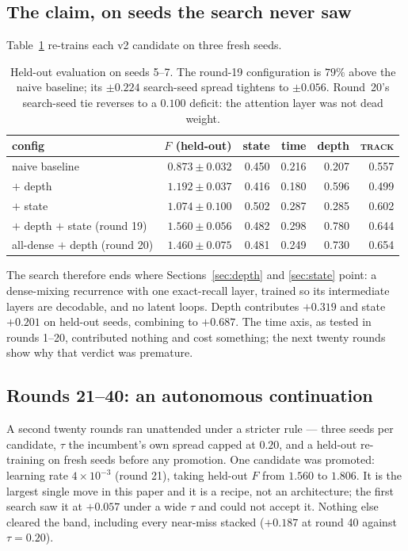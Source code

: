 \subsection{The claim, on seeds the search never saw}

Table~\ref{tab:holdout} re-trains each v2 candidate on three fresh seeds.

\begin{table}[h]
\centering
\begin{tabular}{lrrrrr}
\toprule
config & $F$ (held-out) & state & time & depth & \textsc{track} \\
\midrule
naive baseline & $0.873 \pm 0.032$ & 0.450 & 0.216 & 0.207 & 0.557 \\
$+$ depth & $1.192 \pm 0.037$ & 0.416 & 0.180 & 0.596 & 0.499 \\
$+$ state & $1.074 \pm 0.100$ & 0.502 & 0.287 & 0.285 & 0.602 \\
$+$ depth $+$ state (round 19) & $\mathbf{1.560 \pm 0.056}$ & 0.482 & 0.298 & 0.780 & 0.644 \\
all-dense $+$ depth (round 20) & $1.460 \pm 0.075$ & 0.481 & 0.249 & 0.730 & 0.654 \\
\bottomrule
\end{tabular}
\caption{Held-out evaluation on seeds 5--7. The round-19 configuration is
$79\%$ above the naive baseline; its $\pm 0.224$ search-seed spread tightens
to $\pm 0.056$. Round~20's search-seed tie reverses to a $0.100$ deficit: the
attention layer was not dead weight.}
\label{tab:holdout}
\end{table}

The search therefore ends where Sections~\ref{sec:depth} and \ref{sec:state}
point: a dense-mixing recurrence with one exact-recall layer, trained so its
intermediate layers are decodable, and no latent loops. Depth contributes
$+0.319$ and state $+0.201$ on held-out seeds, combining to $+0.687$. The
time axis, as tested in rounds 1--20, contributed nothing and cost
something; the next twenty rounds show why that verdict was premature.

\subsection{Rounds 21--40: an autonomous continuation}

A second twenty rounds ran unattended under a stricter rule --- three seeds
per candidate, $\tau$ the incumbent's own spread capped at $0.20$, and a
held-out re-training on fresh seeds before any promotion. One candidate was
promoted: learning rate $4\times10^{-3}$ (round 21), taking held-out $F$ from
$1.560$ to $1.806$. It is the largest single move in this paper and it is a
recipe, not an architecture; the first search saw it at $+0.057$ under a wide
$\tau$ and could not accept it. Nothing else cleared the band, including
every near-miss stacked ($+0.187$ at round 40 against $\tau = 0.20$).

